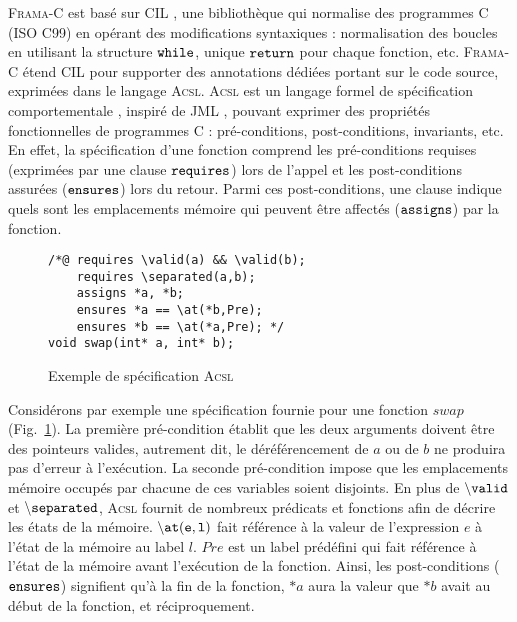 

\textsc{Frama-C} est basé sur CIL \cite{CIL}, une bibliothèque qui normalise des
programmes C (ISO C99) en opérant des modifications syntaxiques : normalisation
des boucles en utilisant la structure ${\tt while}$, unique ${\tt return}$ pour
chaque fonction, etc. \textsc{Frama-C} étend CIL pour supporter des annotations
dédiées portant sur le code source, exprimées dans le langage \textsc{Acsl}.
\textsc{Acsl} \cite{ACSL} est un langage formel de spécification
comportementale \cite{BISL}, inspiré de JML \cite{JML}, pouvant exprimer des
propriétés fonctionnelles de programmes C : pré-conditions, post-conditions,
invariants, etc.\\

En effet, la spécification d'une fonction comprend les pré-conditions requises
(exprimées par une clause ${\tt requires}$) lors de l'appel et les
post-conditions assurées (${\tt ensures}$) lors du retour. Parmi ces
post-conditions, une clause indique quels sont les emplacements mémoire qui
peuvent être affectés (${\tt assigns}$) par la fonction.\\


\begin{figure}[h]
\begin{lstlisting}
/*@ requires \valid(a) && \valid(b);
    requires \separated(a,b);
    assigns *a, *b;
    ensures *a == \at(*b,Pre);
    ensures *b == \at(*a,Pre); */
void swap(int* a, int* b);
\end{lstlisting}
\caption{Exemple de spécification \textsc{Acsl}}\label{fig:acsl-spec}
\end{figure}


Considérons par exemple une spécification fournie pour une fonction $swap$
(Fig.~\ref{fig:acsl-spec}). La première pré-condition établit que les deux
arguments doivent être des pointeurs valides, autrement dit, le déréférencement
de $a$ ou de $b$ ne produira pas d'erreur à l'exécution. La seconde
pré-condition impose que les emplacements mémoire occupés par chacune de ces
variables soient disjoints. En plus de ${\tt \backslash valid}$ et
${\tt \backslash separated}$, \textsc{Acsl} fournit de nombreux prédicats et
fonctions afin de décrire les états de la mémoire. ${\tt \backslash at(e,l)}$
fait référence à la valeur de l'expression $e$ à l'état de la mémoire au label
$l$. $Pre$ est un label prédéfini qui fait référence à l'état de la mémoire
avant l'exécution de la fonction. Ainsi, les post-conditions (${\tt ensures}$)
signifient qu'à la fin de la fonction, $*a$ aura la valeur que $*b$ avait au
début de la fonction, et réciproquement.\\


